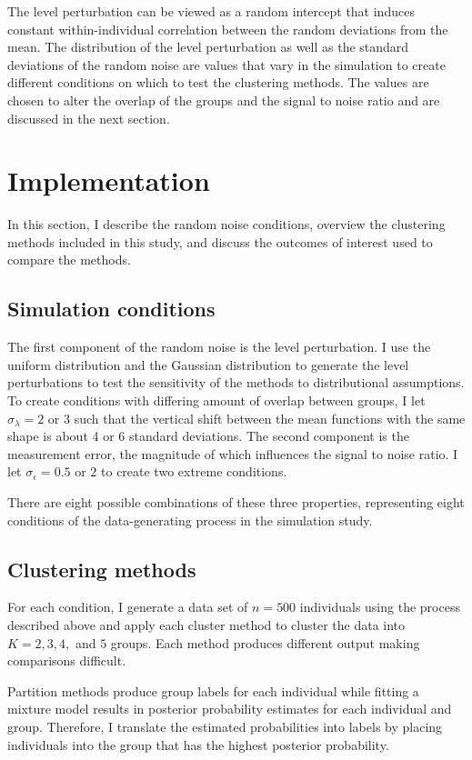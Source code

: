 The level perturbation can be viewed as a random intercept that induces constant within-individual correlation between the random deviations from the mean. The distribution of the level perturbation as well as the standard deviations of the random noise are values that vary in the simulation to create different conditions on which to test the clustering methods. The values are chosen to alter the overlap of the groups and the signal to noise ratio and are discussed in the next section.

\section{Implementation}
In this section, I describe the random noise conditions, overview the clustering methods included in this study, and discuss the outcomes of interest used to compare the methods. 
\subsection{Simulation conditions}
The first component of the random noise is the level perturbation. I use the uniform distribution and the Gaussian distribution to generate the level perturbations to test the sensitivity of the methods to distributional assumptions. To create conditions with differing amount of overlap between groups, I let $\sigma_{\lambda}=2$ or $3$ such that the vertical shift between the mean functions with the same shape is about 4 or 6 standard deviations. The second component is the measurement error, the magnitude of which influences the signal to noise ratio. I let $\sigma_{\epsilon}=0.5$ or $2$ to create two extreme conditions. 

There are eight possible combinations of these three properties, representing eight conditions of the data-generating process in the simulation study. 
\subsection{Clustering methods}
For each condition, I generate a data set of $n=500$ individuals using the process described above and apply each cluster method to cluster the data into $K=2,3,4,$ and $5$ groups. Each method produces different output making comparisons difficult. 

Partition methods produce group labels for each individual while fitting a mixture model results in posterior probability estimates for each individual and group. Therefore, I translate the estimated probabilities into labels by placing individuals into the group that has the highest posterior probability.

